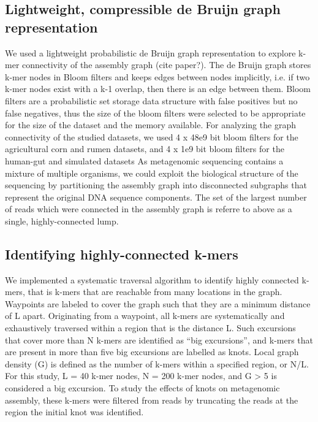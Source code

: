 \documentclass[11pt]{article} %
\begin{document}
\subsection{Lightweight, compressible de Bruijn graph representation}

We used a lightweight probabilistic de Bruijn graph representation
to explore k-mer connectivity of the assembly graph (cite paper?).
The de Bruijn graph stores k-mer nodes in Bloom filters and keeps
edges between nodes implicitly, i.e. if two k-mer nodes exist with
a k-1 overlap, then there is an edge between them. Bloom filters are
a probabilistic set storage data structure with false positives but
no false negatives, thus the size of the bloom filters were selected
to be appropriate for the size of the dataset and the memory available.
For analyzing the graph connectivity of the studied datasets, we used
4 x 48e9 bit bloom filters for the agricultural corn and rumen datasets,
and 4 x 1e9 bit bloom filters for the human-gut and simulated datasets
As metagenomic sequencing contains a mixture of multiple organisms, we
could exploit the biological structure of the sequencing by partitioning
the assembly graph into disconnected subgraphs that represent the
original DNA sequence components. The set of the largest number of
reads which were connected in the assembly graph is referre to above as a single, highly-connected lump. 

\subsection{Identifying highly-connected k-mers}

We implemented a systematic traversal algorithm to identify highly
connected k-mers, that is k-mers that are reachable from many locations
in the graph. Waypoints are labeled to cover the graph such that they
are a minimum distance of L apart. Originating from a waypoint, all
k-mers are systematically and exhaustively traversed within a region
that is the distance L. Such excursions that cover more than N k-mers
are identified as ``big excursions'', and k-mers that are present
in more than five big excursions are labelled as knots. Local graph
density (G) is defined as the number of k-mers within a specified
region, or N/L. For this study, L = 40 k-mer nodes, N = 200 k-mer
nodes, and G > 5 is considered a big excursion. To study the effects
of knots on metagenomic assembly, these k-mers were filtered from
reads by truncating the reads at the region the initial knot was identified.
\end{document}
